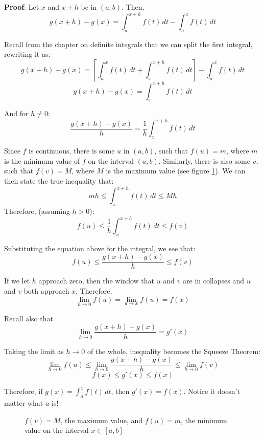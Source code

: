 \textbf{Proof}: Let $x$ and $x + h$ be in $\left( a, b \right)$. Then,
$$g(x + h) - g(x) = \int_a^{x + h} f(t)\,dt - \int_a^x f(t)\,dt$$

Recall from the chapter on definite integrals that we can split the first integral, rewriting it as:
$$g(x + h) - g(x) = \left[ \int_a^x f(t)\,dt + \int_x^{x + h} f(t)\,dt \right] - \int_a^x f(t)\,dt$$
$$g(x + h) - g(x) = \int_x^{x + h} f(t)\,dt$$

And for $h \neq 0$:
$$\frac{g(x + h) - g(x)}{h} = \frac{1}{h}\int_x^{x + h} f(t)\,dt$$

Since $f$ is continuous, there is some $u$ in $(a, b)$, such that $f(u) = m$, where $m$ is the minimum value of $f$ on the interval $(a, b)$. Similarly, there is also some $v$, such that $f(v) = M$, where $M$ is the maximum value (see figure \ref{FTCextreme}). We can then state the true inequality that:
$$mh \leq \int_x^{x + h} f(t) \,dt \leq Mh$$
Therefore, (assuming $h > 0$):
$$f(u) \leq \frac{1}{h} \int_x^{x + h} f(t)\,dt \leq f(v)$$

Substituting the equation above for the integral, we see that:
$$f(u) \leq \frac{g(x + h) - g(x)}{h} \leq f(v)$$

If we let $h$ approach zero, then the window that $u$ and $v$ are in collapses and $u$ and $v$ both approach $x$. Therefore, 
$$\lim_{h \to 0} f(u) = \lim_{u \to x} f(u) = f(x)$$

Recall also that 
$$\lim_{h \to 0} \frac{g(x + h) - g(x)}{h} = g'(x)$$

Taking the limit as $h \to 0$ of the whole, inequality becomes the Squeeze Theorem:
$$\lim_{h \to 0} f(u) \leq \lim_{h \to 0} \frac{g(x + h) - g(x)}{h} \leq \lim_{h \to 0} f(v)$$
$$f(x) \leq g'(x) \leq f(x)$$

Therefore, if $g(x) = \int_a^x f(t)\,dt$, then $g'(x) = f(x)$. Notice it doesn't matter what $a$ is!

\begin{figure}[htbp]
\centering
    \label{FTCextreme}
    \caption{$f(v) = M$, the maximum value, and $f(u) = m$, the minimum value on the interval $x \in [a, b]$}
    \end{figure}

